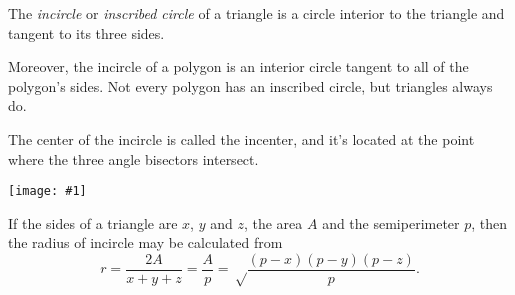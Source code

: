 \documentclass[12pt]{article}
\newcommand{\figura}[1]{\begin{center}\texttt{[image: \#1]}\end{center}}
\begin{document}
The \emph{incircle} or \emph{inscribed circle} of a triangle is a circle interior to the triangle and tangent to its three sides. 

Moreover, the incircle of a polygon is an interior circle tangent to all of the polygon's sides. Not every polygon has an inscribed circle, but triangles always do.

The center of the incircle is called the incenter, and it's located at the point where the three angle bisectors intersect.
\figura{incentre}

If the sides of a triangle are $x$, $y$ and $z$, the area $A$ and the semiperimeter $p$, then the radius of incircle may be calculated from
$$r = \frac{2A}{x+y+z} = \frac{A}{p} = \sqrt\frac{(p-x)(p-y)(p-z)}{p}.$$
\end{document}
